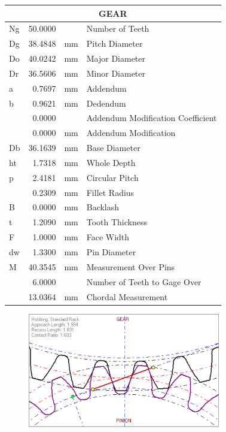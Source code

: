 \begin{appendices}
    \begin{center}
    \begin{tabular}{|l|r|l|l|}
    \hline
    \multicolumn{4}{|c|}{\textbf{GEAR}} \\ \hline
    Ng & 50.0000 &  & Number of Teeth \\ \hline
    Dg & 38.4848 & mm & Pitch Diameter \\ \hline
    Do & 40.0242 & mm & Major Diameter \\ \hline
    Dr & 36.5606 & mm & Minor Diameter \\ \hline
    a & 0.7697 & mm & Addendum \\ \hline
    b & 0.9621 & mm & Dedendum \\ \hline
     & 0.0000 &  & Addendum Modification Coefficient \\ \hline
     & 0.0000 & mm & Addendum Modification \\ \hline
    Db & 36.1639 & mm & Base Diameter \\ \hline
    ht & 1.7318 & mm & Whole Depth \\ \hline
    p & 2.4181 & mm & Circular Pitch \\ \hline
     & 0.2309 & mm & Fillet Radius \\ \hline
    B & 0.0000 & mm & Backlash \\ \hline
    t & 1.2090 & mm & Tooth Thickness \\ \hline
    F & 1.0000 & mm & Face Width \\ \hline
    dw & 1.3300 & mm &   Pin Diameter \\ \hline
    M & 40.3545 & mm &   Measurement Over Pins \\ \hline
     & 6.0000 &  &   Number of Teeth to Gage Over \\ \hline
     & 13.0364 & mm &   Chordal Measurement \\ \hline
    \end{tabular}
    \end{center}

    \begin{figure}[hb]
        \centering
        \includegraphics[width=0.75\textwidth]{figures/hip_gears.PNG}
    \end{figure}

    \null
    \vfill

\end{appendices}
